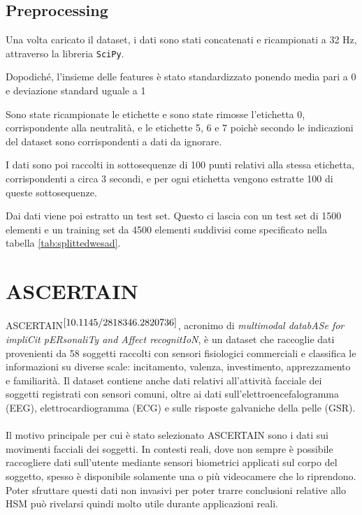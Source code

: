 \subsection{Preprocessing}  %
Una volta caricato il dataset, i dati sono stati concatenati e ricampionati a 32 Hz, attraverso la libreria \texttt{SciPy}.

Dopodiché, l'insieme delle features è stato standardizzato ponendo media pari a 0 e deviazione standard uguale a 1

Sono state ricampionate le etichette e sono state rimosse l'etichetta 0, corrispondente alla neutralità, e le etichette 5, 6 e 7 poichè secondo le indicazioni del dataset sono corrispondenti a dati da ignorare.



I dati sono poi raccolti in sottosequenze di 100 punti relativi alla stessa etichetta, corrispondenti a circa 3 secondi, e per ogni etichetta vengono estratte 100 di queste sottosequenze.

Dai dati viene poi estratto un test set. Questo ci lascia con un test set di 1500 elementi e un training set da 4500 elementi suddivisi come specificato nella tabella \ref{tab:splittedwesad}.

\section{ASCERTAIN }
ASCERTAIN$^{\cite{10.1145/2818346.2820736}}$, acronimo di \textit{multimodal databASe for impliCit pERsonaliTy and Affect recognitIoN}, è un dataset che raccoglie dati provenienti da 58 soggetti raccolti con sensori fisiologici commerciali e classifica le informazioni su diverse scale: incitamento, valenza, investimento, apprezzamento e familiarità. Il dataset contiene anche dati relativi all'attività facciale dei soggetti registrati con sensori comuni, oltre ai dati sull'elettroencefalogramma (EEG), elettrocardiogramma (ECG) e sulle risposte galvaniche della pelle (GSR).\\\\
Il motivo principale per cui è stato selezionato ASCERTAIN sono i dati sui movimenti facciali dei soggetti. In contesti reali, dove non sempre è possibile raccogliere dati sull'utente mediante sensori biometrici applicati sul corpo del soggetto, spesso è disponibile solamente una o più videocamere che lo riprendono. Poter sfruttare questi dati non invasivi per poter trarre conclusioni relative allo HSM può rivelarsi quindi molto utile durante applicazioni reali.
